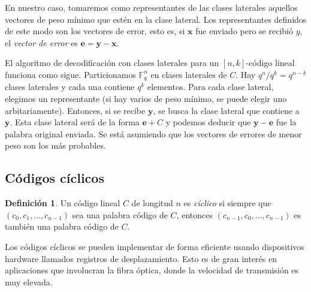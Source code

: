 \documentclass[a4paper,11pt]{article}
\numberwithin{equation}{section}
\theoremstyle{definition} %
\newtheorem{definicion}{Definición}[section]
\newcommand{\x}{\mathbf{x}}
\newcommand{\y}{\mathbf{y}}
\newcommand{\e}{\mathbf{e}}
\newcommand{\Fqn}{\mathbb{F}_q^n}
\begin{document}
    En nuestro caso, tomaremos como representantes de las clases laterales aquellos vectores de peso mínimo que estén en la clase lateral. Los representantes definidos de este modo son los vectores de error, esto es, si $\x$ fue enviado pero se recibió $y$, el \emph{vector de error} es $\e = \y - \x$.

    El algoritmo de decodificación con clases laterales para un $[n, k]$-código lineal funciona como sigue. Particionamos $\Fqn$ en clases laterales de $C$. Hay $q^n / q^k = q^{n - k}$ clases laterales y cada una contiene $q^k$ elementos. Para cada clase lateral, elegimos un representante (si hay varios de peso mínimo, se puede elegir uno arbitariamente). Entonces, si se recibe $\y$, se busca la clase lateral que contiene a $\y$. Esta clase lateral será de la forma $\e + C$ y podemos deducir que $\y - \e$ fue la palabra original enviada. Se está asumiendo que los vectores de errores de menor peso son los más probables.

    \subsection{Códigos cíclicos}

    \begin{definicion}
        Un código lineal $C$ de longitud $n$ es \emph{cíclico} si siempre que $(c_0, c_1, \dots, c_{n-1})$ sea una palabra código de $C$, entonces $(c_{n-1}, c_0, \dots, c_{n-1})$ es también una palabra código de $C$.
    \end{definicion}

    Los códigos cíclicos se pueden implementar de forma eficiente usando dispositivos hardware llamados registros de desplazamiento. Esto es de gran interés en aplicaciones que involucran la fibra óptica, donde la velocidad de transmisión es muy elevada.
\end{document}
